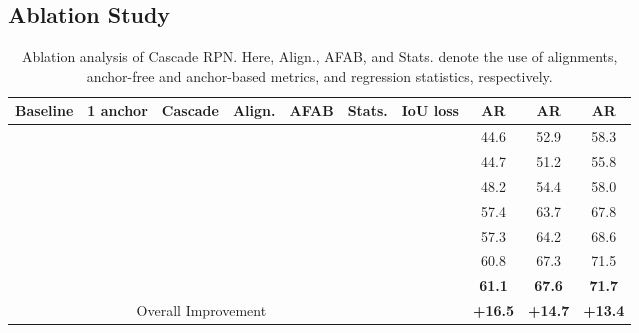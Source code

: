 \documentclass{article}
\begin{document}
	\subsection{Ablation Study}
	\begin{table}[!t]
		\small
		\centering
		\caption{Ablation analysis of Cascade RPN. Here, Align., AFAB, and Stats. denote the use of alignments, anchor-free and anchor-based metrics, and regression statistics, respectively.}
		\begin{tabular}{ccccccc|ccc} \toprule[1pt]
			Baseline & 1 anchor & Cascade & Align. & AFAB & Stats.  & IoU loss&  AR   & AR & AR \\ \midrule[0.5pt]
			\checkmark        &          &          &       &      &      &                                        & 44.6 & 52.9 & 58.3 \\
			& \checkmark        &          &       &      &      &                                                 & 44.7 & 51.2 & 55.8 \\
			& \checkmark        & \checkmark        &       &      &          &                                    & 48.2 & 54.4 & 58.0 \\
			& \checkmark        & \checkmark        & \checkmark     &      &       &                              & 57.4 & 63.7 & 67.8 \\
			& \checkmark        & \checkmark        & \checkmark     & \checkmark    &           &                 & 57.3 & 64.2 & 68.6 \\
			& \checkmark        & \checkmark        & \checkmark     & \checkmark    & \checkmark &                & 60.8 & 67.3 & 71.5 \\ 
			& \checkmark        & \checkmark        & \checkmark     & \checkmark    & \checkmark     &\checkmark  & \textbf{61.1} & \textbf{67.6} & \textbf{71.7} \\ \midrule[0.5pt]
			\multicolumn{6}{c}{Overall Improvement} & & \textbf{+16.5} & \textbf{+14.7} & \textbf{+13.4} \\ \bottomrule[1pt]
		\end{tabular}
		\label{tab:ablation}
	\end{table}
	
\end{document}
